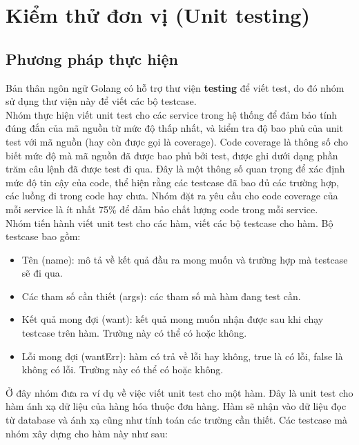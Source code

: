 
\section{Kiểm thử đơn vị (Unit testing)}
\subsection{Phương pháp thực hiện}

Bản thân ngôn ngữ Golang có hỗ trợ thư viện \textbf{testing} để viết test, do đó nhóm sử dụng thư viện này để viết các bộ testcase.\\

Nhóm thực hiện viết unit test cho các service trong hệ thống để đảm bảo tính đúng đắn của mã nguồn từ mức độ thấp nhất, và kiểm tra độ bao phủ của unit test với mã nguồn (hay còn được gọi là coverage). Code coverage là thông số cho biết mức độ mà mã nguồn đã được bao phủ bởi test, được ghi dưới dạng phần trăm câu lệnh đã được test đi qua. Đây là một thông số quan trọng để xác định mức độ tin cậy của code, thể hiện rằng các testcase đã bao đủ các trường hợp, các luồng đi trong code hay chưa. Nhóm đặt ra yêu cầu cho code coverage của mỗi service là ít nhất 75\% để đảm bảo chất lượng code trong mỗi service.\\

Nhóm tiến hành viết unit test cho các hàm, viết các bộ testcase cho hàm. Bộ testcase bao gồm:
\begin{itemize}
    \item Tên (name): mô tả về kết quả đầu ra mong muốn và trường hợp mà testcase sẽ đi qua.
    \item Các tham số cần thiết (args): các tham số mà hàm đang test cần.
    \item Kết quả mong đợi (want): kết quả mong muốn nhận được sau khi chạy testcase trên hàm. Trường này có thể có hoặc không.
    \item Lỗi mong đợi (wantErr): hàm có trả về lỗi hay không, true là có lỗi, false là không có lỗi. Trường này có thể có hoặc không.
\end{itemize}

Ở đây nhóm đưa ra ví dụ về việc viết unit test cho một hàm. Đây là unit test cho hàm ánh xạ dữ liệu của hàng hóa thuộc đơn hàng. Hàm sẽ nhận vào dữ liệu đọc từ database và ánh xạ cũng như tính toán các trường cần thiết. Các testcase mà nhóm xây dựng cho hàm này như sau:\\
\newpage

